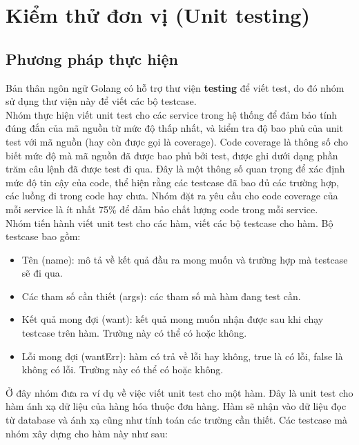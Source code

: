 
\section{Kiểm thử đơn vị (Unit testing)}
\subsection{Phương pháp thực hiện}

Bản thân ngôn ngữ Golang có hỗ trợ thư viện \textbf{testing} để viết test, do đó nhóm sử dụng thư viện này để viết các bộ testcase.\\

Nhóm thực hiện viết unit test cho các service trong hệ thống để đảm bảo tính đúng đắn của mã nguồn từ mức độ thấp nhất, và kiểm tra độ bao phủ của unit test với mã nguồn (hay còn được gọi là coverage). Code coverage là thông số cho biết mức độ mà mã nguồn đã được bao phủ bởi test, được ghi dưới dạng phần trăm câu lệnh đã được test đi qua. Đây là một thông số quan trọng để xác định mức độ tin cậy của code, thể hiện rằng các testcase đã bao đủ các trường hợp, các luồng đi trong code hay chưa. Nhóm đặt ra yêu cầu cho code coverage của mỗi service là ít nhất 75\% để đảm bảo chất lượng code trong mỗi service.\\

Nhóm tiến hành viết unit test cho các hàm, viết các bộ testcase cho hàm. Bộ testcase bao gồm:
\begin{itemize}
    \item Tên (name): mô tả về kết quả đầu ra mong muốn và trường hợp mà testcase sẽ đi qua.
    \item Các tham số cần thiết (args): các tham số mà hàm đang test cần.
    \item Kết quả mong đợi (want): kết quả mong muốn nhận được sau khi chạy testcase trên hàm. Trường này có thể có hoặc không.
    \item Lỗi mong đợi (wantErr): hàm có trả về lỗi hay không, true là có lỗi, false là không có lỗi. Trường này có thể có hoặc không.
\end{itemize}

Ở đây nhóm đưa ra ví dụ về việc viết unit test cho một hàm. Đây là unit test cho hàm ánh xạ dữ liệu của hàng hóa thuộc đơn hàng. Hàm sẽ nhận vào dữ liệu đọc từ database và ánh xạ cũng như tính toán các trường cần thiết. Các testcase mà nhóm xây dựng cho hàm này như sau:\\
\newpage

